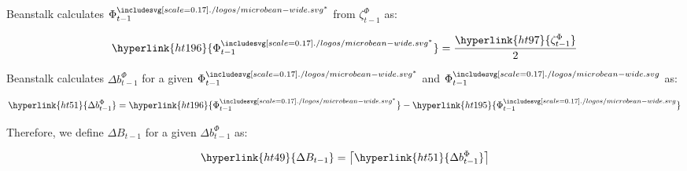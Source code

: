 \documentclass[class=article, crop=false]{standalone}
\begin{document}
\begin{enumerate}
        Beanstalk calculates \hyperlink{ht196}{$\Phi_{t-1}^{{\bean}^*}$} from \hyperlink{ht97}{$\zeta^{\Phi}_{t-1}$} as:
        
            $$
                \hyperlink{ht196}{\Phi_{t-1}^{{\bean}^*}} = 
                    \frac{\hyperlink{ht97}{\zeta^{\Phi}_{t-1}}}
                        {2}
            $$

        Beanstalk calculates \hyperlink{ht51}{$\Delta b_{t-1}^{\Phi}$} for a given \hyperlink{ht196}{$\Phi_{t-1}^{{\bean}^*}$} and \hyperlink{ht195}{$\Phi_{t-1}^{\bean}$} as:
        
            $$
                \hyperlink{ht51}{\Delta b_{t-1}^{\Phi}} = 
                    \hyperlink{ht196}{\Phi_{t-1}^{{\bean}^*}} - \hyperlink{ht195}{\Phi_{t-1}^{\bean}}
            $$
        
\end{enumerate}

Therefore, we define \hyperlink{ht49}{$\Delta B_{t-1}$} for a given \hyperlink{ht51}{$\Delta b_{t-1}^{\Phi}$} as:

    $$
        \hyperlink{ht49}{\Delta B_{t-1}} = \left\lceil\hyperlink{ht51}{\Delta b_{t-1}^{\Phi}}\right\rceil
    $$
\end{document}
